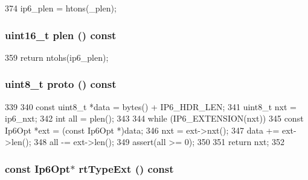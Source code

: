 \begin{DoxyCode}
374 { ip6_plen = htons(_plen); }
\end{DoxyCode}
\hypertarget{structNet_1_1Ip6Hdr_a86c05206b7d72010f7438756e85fb9ec}{
\subsubsection[{plen}]{\setlength{\rightskip}{0pt plus 5cm}uint16\_\-t plen () const}}
\label{structNet_1_1Ip6Hdr_a86c05206b7d72010f7438756e85fb9ec}



\begin{DoxyCode}
359 { return ntohs(ip6_plen); }
\end{DoxyCode}
\hypertarget{structNet_1_1Ip6Hdr_abb57dba0db48d3e9fea9d5aedf436c3e}{
\subsubsection[{proto}]{\setlength{\rightskip}{0pt plus 5cm}uint8\_\-t proto () const}}
\label{structNet_1_1Ip6Hdr_abb57dba0db48d3e9fea9d5aedf436c3e}



\begin{DoxyCode}
339 {
340     const uint8_t *data = bytes() + IP6_HDR_LEN;
341     uint8_t nxt = ip6_nxt;
342     int all = plen();
343 
344     while (IP6_EXTENSION(nxt)) {
345         const Ip6Opt *ext = (const Ip6Opt *)data;
346         nxt = ext->nxt();
347         data += ext->len();
348         all -= ext->len();
349         assert(all >= 0);
350     }
351     return nxt;
352 }
\end{DoxyCode}
\hypertarget{structNet_1_1Ip6Hdr_a3a8a479e7dbca9c422af60d927be851c}{
\subsubsection[{rtTypeExt}]{\setlength{\rightskip}{0pt plus 5cm}const {\bf Ip6Opt}$\ast$ rtTypeExt () const}}
\label{structNet_1_1Ip6Hdr_a3a8a479e7dbca9c422af60d927be851c}



